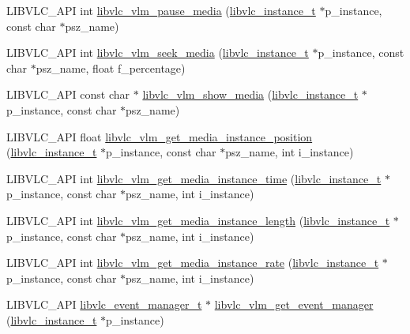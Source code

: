 \begin{DoxyCompactItemize}
\item 
L\+I\+B\+V\+L\+C\+\_\+\+A\+PI int \hyperlink{group__libvlc__vlm_ga869c66a632550f81bf8f618c3cfc7723}{libvlc\+\_\+vlm\+\_\+pause\+\_\+media} (\hyperlink{group__libvlc__core_ga316d739a80da4678206c79f4d6c2e284}{libvlc\+\_\+instance\+\_\+t} $\ast$p\+\_\+instance, const char $\ast$psz\+\_\+name)
\item 
L\+I\+B\+V\+L\+C\+\_\+\+A\+PI int \hyperlink{group__libvlc__vlm_ga3712208ddc85be4dd70cb115487f755e}{libvlc\+\_\+vlm\+\_\+seek\+\_\+media} (\hyperlink{group__libvlc__core_ga316d739a80da4678206c79f4d6c2e284}{libvlc\+\_\+instance\+\_\+t} $\ast$p\+\_\+instance, const char $\ast$psz\+\_\+name, float f\+\_\+percentage)
\item 
L\+I\+B\+V\+L\+C\+\_\+\+A\+PI const char $\ast$ \hyperlink{group__libvlc__vlm_ga711a3740b45dab8dca77decd50fa8277}{libvlc\+\_\+vlm\+\_\+show\+\_\+media} (\hyperlink{group__libvlc__core_ga316d739a80da4678206c79f4d6c2e284}{libvlc\+\_\+instance\+\_\+t} $\ast$p\+\_\+instance, const char $\ast$psz\+\_\+name)
\item 
L\+I\+B\+V\+L\+C\+\_\+\+A\+PI float \hyperlink{group__libvlc__vlm_gad4427a32ff1e4d12512c1878a22bfc79}{libvlc\+\_\+vlm\+\_\+get\+\_\+media\+\_\+instance\+\_\+position} (\hyperlink{group__libvlc__core_ga316d739a80da4678206c79f4d6c2e284}{libvlc\+\_\+instance\+\_\+t} $\ast$p\+\_\+instance, const char $\ast$psz\+\_\+name, int i\+\_\+instance)
\item 
L\+I\+B\+V\+L\+C\+\_\+\+A\+PI int \hyperlink{group__libvlc__vlm_ga1f09b989fd2b6dafb46119bbe6f2f029}{libvlc\+\_\+vlm\+\_\+get\+\_\+media\+\_\+instance\+\_\+time} (\hyperlink{group__libvlc__core_ga316d739a80da4678206c79f4d6c2e284}{libvlc\+\_\+instance\+\_\+t} $\ast$p\+\_\+instance, const char $\ast$psz\+\_\+name, int i\+\_\+instance)
\item 
L\+I\+B\+V\+L\+C\+\_\+\+A\+PI int \hyperlink{group__libvlc__vlm_ga5d8b7bd36576ea8b7ea7910359ba4b5a}{libvlc\+\_\+vlm\+\_\+get\+\_\+media\+\_\+instance\+\_\+length} (\hyperlink{group__libvlc__core_ga316d739a80da4678206c79f4d6c2e284}{libvlc\+\_\+instance\+\_\+t} $\ast$p\+\_\+instance, const char $\ast$psz\+\_\+name, int i\+\_\+instance)
\item 
L\+I\+B\+V\+L\+C\+\_\+\+A\+PI int \hyperlink{group__libvlc__vlm_ga11a2599b0b19764b32a633de6f940620}{libvlc\+\_\+vlm\+\_\+get\+\_\+media\+\_\+instance\+\_\+rate} (\hyperlink{group__libvlc__core_ga316d739a80da4678206c79f4d6c2e284}{libvlc\+\_\+instance\+\_\+t} $\ast$p\+\_\+instance, const char $\ast$psz\+\_\+name, int i\+\_\+instance)
\item 
L\+I\+B\+V\+L\+C\+\_\+\+A\+PI \hyperlink{group__libvlc__event_gaa82f247503d3558b9117550e8d3c9259}{libvlc\+\_\+event\+\_\+manager\+\_\+t} $\ast$ \hyperlink{group__libvlc__vlm_ga66625f651ce1a2b4584947f0a555e439}{libvlc\+\_\+vlm\+\_\+get\+\_\+event\+\_\+manager} (\hyperlink{group__libvlc__core_ga316d739a80da4678206c79f4d6c2e284}{libvlc\+\_\+instance\+\_\+t} $\ast$p\+\_\+instance)
\end{DoxyCompactItemize}


